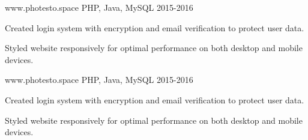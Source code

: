 \begin{cventries}
   {www.photesto.space} {PHP,
    Java, MySQL} {2015-2016} {
    \begin{cvitems}
    \item Created login system with encryption and email verification to protect
      user data.
    \item Styled website responsively for optimal performance on both desktop
      and mobile devices.
    \end{cvitems}
  }
  
   {www.photesto.space} {PHP,
    Java, MySQL} {2015-2016} {
    \begin{cvitems}
    \item Created login system with encryption and email verification to protect
      user data.
    \item Styled website responsively for optimal performance on both desktop
      and mobile devices.
    \end{cvitems}
  }
  
\end{cventries}
